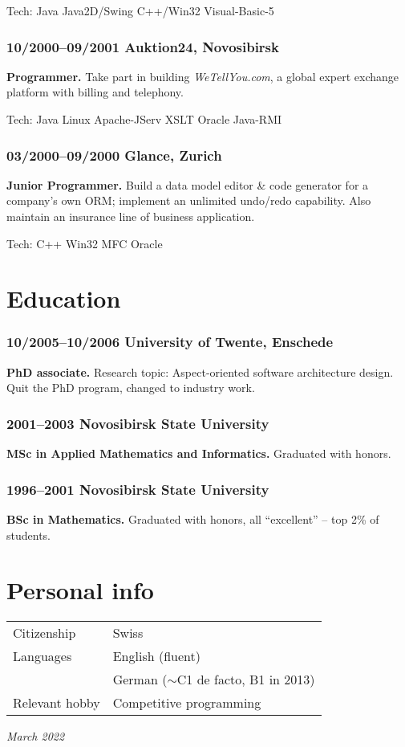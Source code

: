 \documentclass[a4paper, twocolumn, 10pt]{article}
\begin{document}
Tech: Java Java2D/Swing C++/Win32 Visual-Basic-5

\subsubsection*{10/2000--09/2001 Auktion24, Novosibirsk}

\textbf{Programmer.} Take part in building \emph{WeTellYou.com}, a global expert exchange platform
with billing and telephony.

Tech: Java Linux Apache-JServ XSLT Oracle Java-RMI

\subsubsection*{03/2000--09/2000 Glance, Zurich}

\textbf{Junior Programmer.} Build a data model editor \& code generator for a company's own ORM;
implement an unlimited undo/redo capability. Also maintain an insurance line of business
application.

Tech: C++ Win32 MFC Oracle

\section*{Education}

\subsubsection*{10/2005--10/2006 University of Twente, Enschede}

\textbf{PhD associate.} Research topic: Aspect-oriented software architecture design. Quit the PhD
program, changed to industry work.

\subsubsection*{2001--2003 Novosibirsk State University}

\textbf{MSc in Applied Mathematics and Informatics.} Graduated with honors.

\subsubsection*{1996--2001 Novosibirsk State University}

\textbf{BSc in Mathematics.} Graduated with honors, all ``excellent'' -- top 2\% of students.

\section*{Personal info}

\begin{tabular}{l l}
  \vspace{0.2cm}
  Citizenship & Swiss \\
  Languages & English (fluent) \\
  \vspace{0.2cm}
  & German ($\sim$C1 de facto, B1 in 2013) \\
  Relevant hobby & Competitive programming \\
\end{tabular}

\vspace*{\fill}
\hfill \emph{March 2022}
\end{document}
